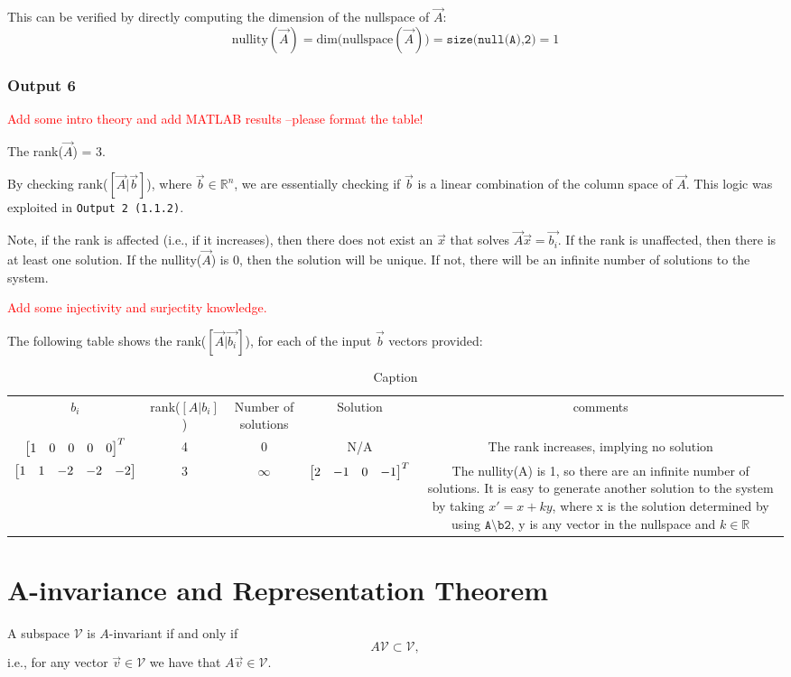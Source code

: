 \documentclass[10pt]{article}
\begin{document}
This can be verified by directly computing the dimension of the nullspace of $\vec{A}$:
\begin{equation*}
    \text{nullity}(\vec{A}) = \text{dim(nullspace}(\vec{A})) = \texttt{size(null(A),2)} = 1
\end{equation*}

\subsubsection{Output 6}
\textcolor{red}{Add some intro theory and add MATLAB results –please format the table!}

The rank($\vec{A}$) = 3. 

By checking rank($[\vec{A} | \vec{b}]$), where $\vec{b} \in \mathbb{R}^n$, we are essentially checking if $\vec{b}$ is a linear combination of the column space of $\vec{A}$. This logic was exploited in \texttt{Output 2 (1.1.2)}. 

Note, if the rank is affected (i.e., if it increases), then there does not exist an $\vec{x}$ that solves $\vec{A}\vec{x} = \vec{b_i}$. If the rank is unaffected, then there is at least one solution. If the nullity($\vec{A}$) is 0, then the solution will be unique. If not, there will be an infinite number of solutions to the system.  

\textcolor{red}{Add some injectivity and surjectity knowledge.}

The following table shows the rank($[\vec{A} | \vec{b_i}]$), for each of the input $\vec{b}$ vectors provided:

\begin{table}[h]
    \centering
    \begin{tabular}{c|c|c|c|c}
        $b_i$ & rank($[A|b_i]$) & Number of solutions & Solution & comments \\ 
        $\begin{bmatrix} 1&0&0&0&0 \end{bmatrix}^T$ & 4 & 0 & N/A & The rank increases, implying no solution\\
        $\begin{bmatrix} 1&1&-2&-2&-2 \end{bmatrix}$ & 3 & $\infty$ & $\begin{bmatrix} 2 & -1 & 0 & -1 \end{bmatrix}^T$ & The nullity(A) is 1, so there are an infinite number of solutions. It is easy to generate another solution to the system by taking $x' = x + ky$, where x is the solution determined by using $\texttt{A\textbackslash b2}$, y is any vector in the nullspace and $k \in \mathbb{R}$
    \end{tabular}
    \caption{Caption}
    \label{tab:my_label}
\end{table}

\section{A-invariance and Representation Theorem}
A subspace $\mathcal{V}$ is $A$-invariant if and only if
\[
    A\mathcal{V} \subset \mathcal{V},
\]
i.e., for any vector $\vec{v} \in \mathcal{V}$ we have that $A\vec{v} \in \mathcal{V}$.
\end{document}
